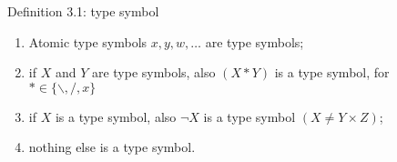 \documentclass{beamer}
\begin{document}
\begin{frame}
\begin{columns}

\begin{column}{0.4 \textwidth}
\begin{exampleblock}{Definition 3.1: type symbol}
  \begin{enumerate}
    \item Atomic type symbols $x,y,w,\dots$ are type symbols;
    \item if $X$ and $Y$ are type symbols, also $(X * Y)$ is a type symbol, for $ * \in \{ \backslash , / , x \}$
    \item if $X$ is a type symbol, also $\neg X$ is a type symbol $( X \neq Y \times Z)$;
    \item nothing else is a type symbol.
  \end{enumerate}
\end{exampleblock}
\end{column}

  \begin{column}{0.7 \textwidth}

  

  \end{column}

\end{columns}
\end{frame}
\end{document}
